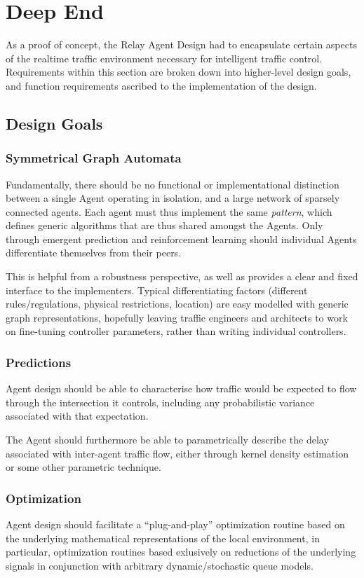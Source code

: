 \documentclass{report}
\begin{document}
\section{Deep End}
\label{sec:deep:design_requirements}

As a proof of concept, the Relay Agent Design had to encapsulate certain aspects of the realtime traffic environment necessary for intelligent traffic control.
Requirements within this section are broken down into higher-level design goals, and function requirements ascribed to the implementation of the design.

\subsection{Design Goals}
\subsubsection{Symmetrical Graph Automata}
Fundamentally, there should be no functional or implementational distinction between a single Agent operating in isolation, and a large network of sparsely connected agents.
Each agent must thus implement the same \emph{pattern}, which defines generic algorithms that are thus shared amongst the Agents.
Only through emergent prediction and reinforcement learning should individual Agents differentiate themselves from their peers.

This is helpful from a robustness perspective, as well as provides a clear and fixed interface to the implementers.
Typical differentiating factors (different rules/regulations, physical restrictions, location) are easy modelled with generic graph representations, hopefully leaving traffic engineers and architects to work on fine-tuning controller parameters, rather than writing individual controllers.

\subsubsection{Predictions}
Agent design should be able to characterise how traffic would be expected to flow through the intersection it controls, including any probabilistic variance associated with that expectation.

The Agent should furthermore be able to parametrically describe the delay associated with inter-agent traffic flow, either through kernel density estimation or some other parametric technique.

\subsubsection{Optimization}
Agent design should facilitate a ``plug-and-play'' optimization routine based on the underlying mathematical representations of the local environment, in particular, optimization routines based exlusively on reductions of the underlying signals in conjunction with arbitrary dynamic/stochastic queue models.
\end{document}
